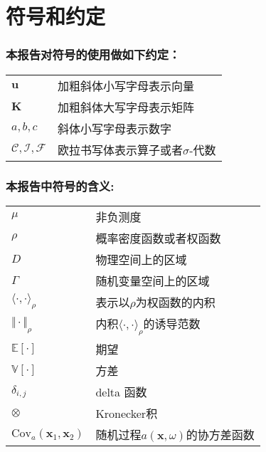 
\chapter{符号和约定}
\subsection*{本报告对符号的使用做如下约定：}
\begin{tabular}{p{5cm}p{9cm}}
    $\bm{u}$ & 加粗斜体小写字母表示向量\\
    $\bm{K}$ & 加粗斜体大写字母表示矩阵\\
    $a,b,c$ & 斜体小写字母表示数字\\
    $\mathcal{C},\mathcal{I} , \mathcal{F}$ &欧拉书写体表示算子或者$\sigma$-代数
\end{tabular}


\subsection*{本报告中符号的含义:}
\begin{tabular}{p{5cm}p{9cm}}
    $\mu$ & 非负测度 \\
    $\rho$ & 概率密度函数或者权函数\\
    $D$ & 物理空间上的区域\\
    $\Gamma$ & 随机变量空间上的区域\\
    $\langle \cdot, \cdot \rangle_{\rho}$ & 表示以$\rho$为权函数的内积\\
    $\Vert\cdot\Vert_{\rho}$ & 内积$\langle \cdot, \cdot \rangle_{\rho}$的诱导范数\\
    $\mathbb{E}[\cdot]$  & 期望\\
    $\mathbb{V}[\cdot]$ & 方差\\
    $\delta_{i,j}$ & delta 函数\\
    $\otimes$ & Kronecker积\\
    $\mathrm{Cov}_a(\bm{x}_1,\bm{x}_2)$& 随机过程$a(\bm{x},\omega)$的协方差函数\\
    
\end{tabular}
